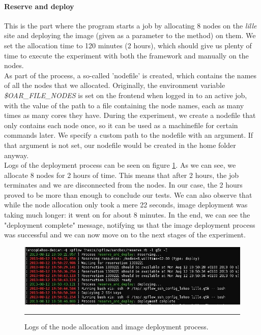 \paragraph{Reserve and deploy}
This is the part where the program starts a job by allocating 8 nodes
on the \emph{lille} site and deploying the image (given as a parameter
to the method) on them. We set the allocation time to 120 minutes (2
hours), which should give us plenty of time to execute the experiment
with both the framework and manually on the nodes.\\[0.3cm]
As part of the process, a so-called 'nodefile' is created, which
contains the names of all the nodes that we allocated. Originally, the
environment variable \emph{\$OAR\_FILE\_NODES} is set on the frontend
when logged in to an active job, with the value of the path to a file
containing the node names, each as many times as many cores they
have. During the experiment, we create a nodefile that only contains
each node once, so it can be used as a machinefile for certain
commands later. We specify a custom path to the nodefile with an
argument. If that argument is not set, our nodefile would be created
in the home folder anyway.\\[0.3cm]
Logs of the deployment process can be seen on
figure \ref{fig:fex_deployment}. As we can see, we allocate 8 nodes
for 2 hours of time. This means that after 2 hours, the job terminates
and we are disconnected from the nodes. In our case, the 2 hours
proved to be more than enough to conclude our tests. We can also
observe that while the node allocation only took a mere 22 seconds,
image deployment was taking much longer: it went on for about 8
minutes. In the end, we can see the "deployment complete" message,
notifying us that the image deployment process was successful and we
can now move on to the next stages of the experiment.

\begin{figure}[htbp]
  \centering
    \includegraphics[scale=0.6]{./Figures/fex_deployment.jpg}
    \rule{35em}{0.5pt}
  \caption[Allocation and deployment]{Logs of the node allocation and
    image deployment process.}
  \label{fig:fex_deployment}
\end{figure}


